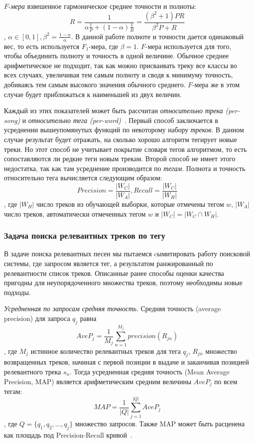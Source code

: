 $F$-\emph{мера} \ld взвешенное гармоническое среднее точности и полноты:
$$R = \frac{1}{\alpha\frac{1}{P} + (1 - \alpha)\frac{1}{R}} = \frac{(\beta^2 + 1)PR}{\beta^2P + R}$$, 
$\alpha \in [0, 1], \beta^2 = \frac{1-\alpha}{\alpha}$. В данной работе полноте и точности дается одинаковый вес, то есть используется $F_1$-мера, где $\beta = 1$.
$F$-мера используется для того, чтобы объединить полноту и точность в одной величине. Обычное среднее арифметическое не подходит, так как можно присваивать треку 
все классы во всех случаях, увеличивая тем самым полноту и сводя к минимуму точность, добиваясь тем самым высокого значения обычного среднего. $F$-мера же в этом случае
будет приближаться к наименьшей из двух величин.

Каждый из этих показателей может быть рассчитан \emph{относительно трека (per-song)} и \emph{относительно тега (per-word)}~\cite{msordo_thesis, turnbull}.
Первый способ заключается в усреднении вышеупомянутых функций по некоторому набору \emph{треков}. В данном случае результат будет отражать, на сколько хорошо алгоритм тегирует новые треки.
Но этот способ не учитывает покрытие словаря тегов алгоритмом, то есть сопоставляются ли редкие теги новым трекам. Второй способ не имеет этого недостатка, так как там усреднение
производится по \emph{тегам}. Полнота и точность относительно тега вычисляется следующим образом:
$$ Precision = \frac{|W_C|}{|W_A|}, Recall = \frac{|W_C|}{|W_H|} $$,
где $|W_H|$ \ld число треков из обучающей выборки, которые отмечены тегом $w$, $|W_A|$ \ld число треков, автоматически отмеченных тегом $w$ и $|W_C| = |W_C \cap W_H|$.

\subsubsection{Задача поиска релевантных треков по тегу}

В задаче поиска релевантных песен мы пытаемся cымитировать работу поисковой системы, где запросом является тег, а результатом \ld ранжированный по релевантности список треков.
Описанные ранее способы оценки качества пригодны для неупорядоченного множества треков, поэтому необходимы новые подходы.

\emph{Усредненная по запросам средняя точность}. Средняя точность (average precision) для запроса $q_j$ равна 
$$ AveP_j = \frac{1}{M_j} \sum_{n=1}^{M_j} precision(R_{jn})$$,
где $M_j$ \ld истинное количество релевантных треков для тега $q_j$, $R_{jn}$ \ld множество возвращенных треков, начиная с первой позиции в выдаче и заканчивая позицией 
релевантного трека $s_n$. Тогда усредненная средняя точность (Mean Average Precision, MAP) является арифметическим средним величины $AveP_j$ по всем тегам:
$$ MAP = \frac{1}{|Q|} \sum_{j=1}^{|Q|} AveP_j $$, где $Q = \{q_1, q_2, \ldots, q_j\}$ \ld множество запросов. 
Также MAP может быть расценена как площадь под Precision-Recall кривой~\cite{prec_recall, turnbull}.

